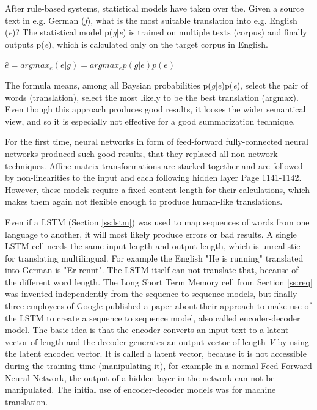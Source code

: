 After rule-based systems, statistical models have taken over the. Given a source text in e.g. German (\textit{f}), what is the most suitable translation into e.g. English (\textit{e})? The statistical model p(\textit{g}|\textit{e}) is trained on multiple texts (corpus) and finally outputs p(\textit{e}), which is calculated only on the target corpus in English. 

\begin{center}
\begin{math}
\hat{e} = argmax_{e}(e|g) = argmax_{e} p(g|e) p(e)
\label{eq:rule}
\end{math}
\end{center}

The formula means, among all Baysian probabilities p(\textit{g}|\textit{e})p(\textit{e}), select the pair of words (translation), select the most likely to be the best translation (argmax). Even though this approach produces good results, it looses the wider semantical view, and so it is especially not effective for a good summarization technique.

For the first time, neural networks in form of feed-forward fully-connected neural networks produced such good results, that they replaced all non-network techniques. Affine matrix transformations are stacked together and are followed by non-linearities to the input and each following hidden layer \cite{Bengio} Page 1141-1142. However, these models require a fixed content length for their calculations, which makes them again not flexible enough to produce human-like translations. 

Even if a LSTM (Section \ref{ss:lstm}) was used to map sequences of words from one language to another, it will most likely produce errors or bad results. A single LSTM cell needs the same input length and output length, which is unrealistic for translating multilingual. For example the English "He is running" translated into German is "Er rennt". The LSTM itself can not translate that, because of the different word length. 
The Long Short Term Memory cell from Section \ref{ss:req} was invented independently from the sequence to sequence models, but
finally three employees of Google published a paper about their approach to make use of the LSTM to create a sequence to sequence model, also called encoder-decoder model.
The basic idea is that the encoder converts an input text to a latent vector of length  and the decoder generates an output vector of length \textit{V} by using the latent encoded vector. It is called a latent vector, because it is not accessible during the training time (manipulating it), for example in a normal Feed Forward Neural Network, the output of a hidden layer in the network can not be manipulated. The initial use of encoder-decoder models was for machine translation.

